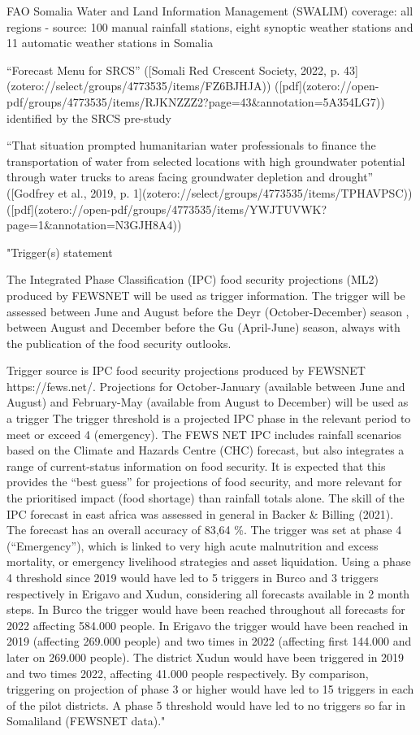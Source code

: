 {FAO Somalia Water and Land Information Management (SWALIM) coverage: all regions - source: 100 manual rainfall stations, eight synoptic weather stations and 11 automatic weather stations in Somalia

“Forecast Menu for SRCS” ([Somali Red Crescent Society, 2022, p. 43](zotero://select/groups/4773535/items/FZ6BJHJA)) ([pdf](zotero://open-pdf/groups/4773535/items/RJKNZZZ2?page=43&annotation=5A354LG7))
identified by the SRCS pre-study



“That situation prompted humanitarian water professionals to finance the transportation of water from selected locations with high groundwater potential through water trucks to areas facing groundwater depletion and drought” ([Godfrey et al., 2019, p. 1](zotero://select/groups/4773535/items/TPHAVPSC)) ([pdf](zotero://open-pdf/groups/4773535/items/YWJTUVWK?page=1&annotation=N3GJH8A4))

"Trigger(s) statement

The  Integrated Phase Classification (IPC) food security projections (ML2) produced by FEWSNET will be used as trigger information. 
The trigger will be assessed between June and August before the Deyr (October-December) season , between August and December before the Gu (April-June) season, always with the  publication of the food security outlooks.


Trigger source is IPC food security projections produced by FEWSNET https://fews.net/. 
Projections for October-January (available between June and August) and  February-May (available from August to December) will be used as a trigger 
The trigger threshold is a projected IPC phase in the relevant period to meet or exceed 4 (emergency). 
The FEWS NET IPC includes rainfall scenarios based on the Climate and Hazards Centre (CHC) forecast, but also integrates a range of current-status information on food security. It is expected that this provides the “best guess” for projections of food security, and more relevant for the prioritised impact (food shortage) than rainfall totals alone. The skill of the IPC forecast in east africa was assessed in general in Backer & Billing (2021). The forecast has an overall accuracy of 83,64 \%. 
The trigger was set at phase 4 (“Emergency”), which is linked to very high acute malnutrition and excess mortality, or emergency livelihood strategies and asset liquidation. 
Using a phase 4 threshold since 2019 would have led to 5 triggers in Burco and 3 triggers respectively in Erigavo and Xudun, considering all forecasts available in 2 month steps. In Burco the trigger would have been reached throughout all forecasts for 2022 affecting 584.000 people. In Erigavo the trigger would have been reached in 2019 (affecting 269.000 people) and two times in 2022 (affecting first 144.000 and later on 269.000 people). The district Xudun would have been triggered in 2019 and two times 2022, affecting 41.000 people respectively.
By comparison, triggering on projection of phase 3 or higher would have led to 15 triggers in each of the pilot districts. A phase 5 threshold would have led to no triggers so far in Somaliland (FEWSNET data)."

}
